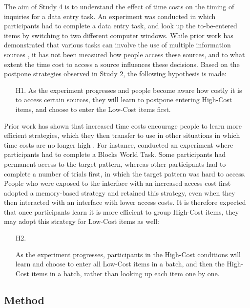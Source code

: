 The aim of Study \hyperref[st:Study4]{4} is to understand the effect of time costs on the timing of inquiries for a data entry task. An experiment was conducted in which participants had to complete a data entry task, and look up the to-be-entered items by switching to two different computer windows. While prior work has demonstrated that various tasks can involve the use of multiple information sources \citep{Cangiano2009, Murphy2016, Su2013}, it has not been measured how people access these sources, and to what extent the time cost to access a source influences these decisions. Based on the postpone strategies observed in Study \hyperref[st:Study2]{2}, the following hypothesis is made:

\begin{itemize}
\item [H1.]
As the experiment progresses and people become aware how costly it is to access certain sources, they will learn to postpone entering High-Cost items, and choose to enter the Low-Cost items first. 
\end{itemize}

Prior work has shown that increased time costs encourage people to learn more efficient strategies, which they then transfer to use in other situations in which time costs are no longer high \citep{OHara1998, Patrick2014, Waldron2007}. For instance, \citet{Patrick2014} conducted an experiment where participants had to complete a Blocks World Task. Some participants had permanent access to the target pattern, whereas other participants had to complete a number of trials first, in which the target pattern was hard to access. People who were exposed to the interface with an increased access cost first adopted a memory-based strategy and retained this strategy, even when they then interacted with an interface with lower access costs. It is therefore expected that once participants learn it is more efficient to group High-Cost items, they may adopt this strategy for Low-Cost items as well:

\begin{itemize}
\item [H2.]

As the experiment progresses, participants in the High-Cost conditions will learn and choose to enter all Low-Cost items in a batch, and then the High-Cost items in a batch, rather than looking up each item one by one.

\end{itemize}

\subsection{Method}
